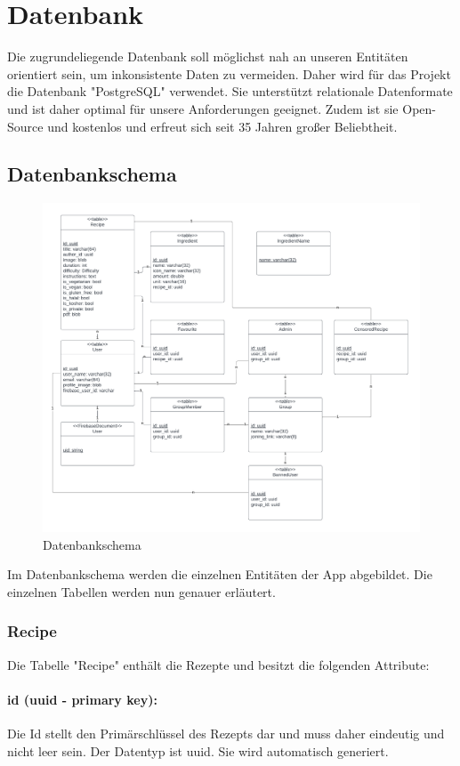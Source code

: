 \documentclass{entwurfsheft}
\begin{document}
\section{Datenbank}
Die zugrundeliegende Datenbank soll möglichst nah an unseren Entitäten orientiert sein, um inkonsistente Daten zu vermeiden. Daher wird für das Projekt die Datenbank "PostgreSQL" verwendet. Sie unterstützt relationale Datenformate und ist daher optimal für unsere Anforderungen geeignet. Zudem ist sie Open-Source und kostenlos und erfreut sich seit 35 Jahren großer Beliebtheit.
\subsection{Datenbankschema}
\begin{figure}[htp]
    \centering
    \includegraphics[width = \linewidth]{images/database/databaseSchema.pdf}
    \caption{Datenbankschema}
\end{figure}
Im Datenbankschema werden die einzelnen Entitäten der App abgebildet. Die einzelnen Tabellen werden nun genauer erläutert.
\newpage
\subsubsection{Recipe}
Die Tabelle "Recipe" enthält die Rezepte und besitzt die folgenden Attribute:
\paragraph{id (uuid - primary key):} Die Id stellt den Primärschlüssel des Rezepts dar und muss daher eindeutig und nicht leer sein. Der Datentyp ist \Gls{uuid}. Sie wird automatisch generiert.
\end{document}
